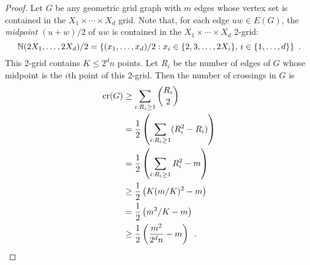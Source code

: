 \documentclass{patmorin}
\DeclareMathOperator{\crs}{cr}
\begin{document}
\begin{proof}
  Let $G$ be any geometric grid graph with $m$ edges whose vertex set
  is contained in the $X_1\times \cdots\times X_d$ grid.  Note that,
  for each edge $uw\in E(G)$, the \emph{midpoint} $(u+w)/2$ of $uw$
  is contained in the $X_1\times\cdots\times X_d$ 2-grid:
  \[
    \mathbb{N}(2X_1,\ldots,2X_d)/2=\{(x_1,\ldots,x_d)/2:
         \mbox{$x_i \in \{2,3,\ldots,2X_i\}$, 
               $i\in\{1,\ldots,d\}$}\} \enspace .
  \]
  This 2-grid contains $K\le 2^dn$ points.  Let $R_i$ be the number of
  edges of $G$ whose midpoint is the $i$th point of this 2-grid. Then
  the number of crossings in $G$ is
  \begin{align*}
   \crs(G) &\ge \sum_{i:R_i\ge 1}\binom{R_i}{2} \\
    & = \frac{1}{2}\left(\sum_{i:R_i\ge 1}(R_i^2-R_i)\right) \\
    & = \frac{1}{2}\left(\sum_{i:R_i\ge 1} R_i^2 - m\right) \\
    & \ge \frac{1}{2}\left(K(m/K)^2 - m\right) \\
    & = \frac{1}{2}\left(m^2/K - m\right) \\
    & \ge \frac{1}{2}\left(\frac{m^2}{2^{d}n} - m\right) \enspace . \qedhere
  \end{align*}
%
\end{proof}
\end{document}
